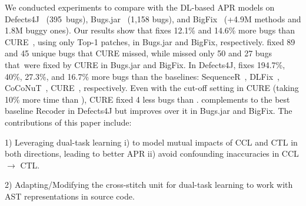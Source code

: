 We conducted experiments to compare {\tool} with the DL-based APR
models on Defects4J~\cite{defects4j} (395~bugs),
Bugs.jar~\cite{saha2018bugs} (1,158 bugs), and
BigFix~\cite{yioopsla19} (+4.9M methods and 1.8M buggy ones). Our
results show that {\tool} fixes 12.1\% and 14.6\% more bugs than
CURE~\cite{cure-icse21}, using only Top-1 patches, in Bugs.jar and
BigFix, respectively.
{\tool} fixed 89 and 45 unique bugs that CURE missed, while {\tool}
missed only 50 and 27 bugs that~were fixed by CURE in Bugs.jar and
BigFix. In Defects4J, {\tool} fixes 194.7\%, 40\%, 27.3\%, and 16.7\%
more bugs than the baselines: SequenceR~\cite{chen2018sequencer},
DLFix~\cite{icse20}, CoCoNuT~\cite{lutellier2020coconut},
CURE~\cite{cure-icse21}, respectively.  
Even with the cut-off setting in CURE (taking 10\% more time than
{\tool}), CURE fixed 4 less bugs than {\tool}. {\tool} complements to
the best baseline Recoder in Defects4J but improves over it in
Bugs.jar and BigFix. The contributions of this paper include:




1) Leveraging dual-task learning i) to model mutual impacts of CCL and
CTL in both directions, leading to better APR ii) avoid confounding
inaccuracies in CCL $\rightarrow$ CTL.

2) Adapting/Modifying the cross-stitch unit for dual-task
learning to work with AST representations in source code.





